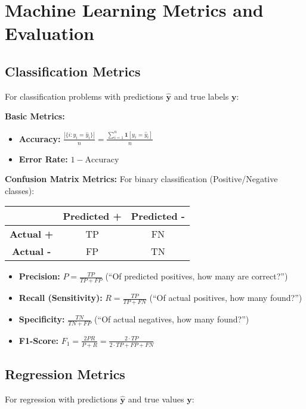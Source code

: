 \documentclass{article}
\providecommand{\vy}{\mathbf{y}}
\begin{document}
\section{Machine Learning Metrics and Evaluation}

\subsection{Classification Metrics}
For classification problems with predictions $\hat{\vy}$ and true labels $\vy$:

\textbf{Basic Metrics:}
\begin{itemize}
	\item \textbf{Accuracy:} $\frac{|\{i : y_i = \hat{y}_i\}|}{n} = \frac{\sum_{i=1}^n \mathbf{1}[y_i = \hat{y}_i]}{n}$
	\item \textbf{Error Rate:} $1 - \text{Accuracy}$
\end{itemize}

\textbf{Confusion Matrix Metrics:}
For binary classification (Positive/Negative classes):
\begin{center}
\begin{tabular}{|c|c|c|}
\hline
 & \textbf{Predicted +} & \textbf{Predicted -} \\
\hline
\textbf{Actual +} & TP & FN \\
\hline
\textbf{Actual -} & FP & TN \\
\hline
\end{tabular}
\end{center}

\begin{itemize}
	\item \textbf{Precision:} $P = \frac{TP}{TP + FP}$ (``Of predicted positives, how many are correct?'')
	\item \textbf{Recall (Sensitivity):} $R = \frac{TP}{TP + FN}$ (``Of actual positives, how many found?'')
	\item \textbf{Specificity:} $\frac{TN}{TN + FP}$ (``Of actual negatives, how many found?'')
	\item \textbf{F1-Score:} $F_1 = \frac{2PR}{P + R} = \frac{2 \cdot TP}{2 \cdot TP + FP + FN}$
\end{itemize}

\subsection{Regression Metrics}
For regression with predictions $\hat{\vy}$ and true values $\vy$:
\end{document}
